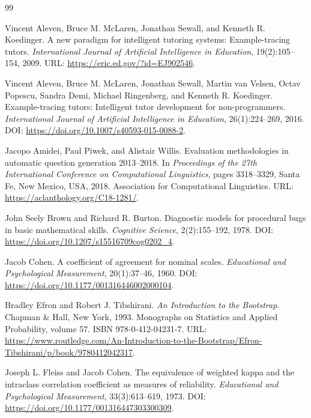 \begin{thebibliography}{99}

Vincent Aleven, Bruce M. McLaren, Jonathan Sewall, and Kenneth R. Koedinger.
\newblock A new paradigm for intelligent tutoring systems: Example-tracing tutors.
\newblock \emph{International Journal of Artificial Intelligence in Education}, 19(2):105--154, 2009.
\newblock URL: \url{https://eric.ed.gov/?id=EJ902546}.

Vincent Aleven, Bruce M. McLaren, Jonathan Sewall, Martin van Velsen, Octav Popescu, Sandra Demi, Michael Ringenberg, and Kenneth R. Koedinger.
\newblock Example-tracing tutors: Intelligent tutor development for non-programmers.
\newblock \emph{International Journal of Artificial Intelligence in Education}, 26(1):224--269, 2016.
\newblock DOI: \url{https://doi.org/10.1007/s40593-015-0088-2}.

Jacopo Amidei, Paul Piwek, and Alistair Willis.
\newblock Evaluation methodologies in automatic question generation 2013--2018.
\newblock In \emph{Proceedings of the 27th International Conference on Computational Linguistics}, pages 3318--3329, Santa Fe, New Mexico, USA, 2018. Association for Computational Linguistics.
\newblock URL: \url{https://aclanthology.org/C18-1281/}.

John Seely Brown and Richard R. Burton.
\newblock Diagnostic models for procedural bugs in basic mathematical skills.
\newblock \emph{Cognitive Science}, 2(2):155--192, 1978.
\newblock DOI: \url{https://doi.org/10.1207/s15516709cog0202_4}.

Jacob Cohen.
\newblock A coefficient of agreement for nominal scales.
\newblock \emph{Educational and Psychological Measurement}, 20(1):37--46, 1960.
\newblock DOI: \url{https://doi.org/10.1177/001316446002000104}.

Bradley Efron and Robert J. Tibshirani.
\newblock \emph{An Introduction to the Bootstrap}.
\newblock Chapman \& Hall, New York, 1993. Monographs on Statistics and Applied Probability, volume 57. ISBN 978-0-412-04231-7.
\newblock URL: \url{https://www.routledge.com/An-Introduction-to-the-Bootstrap/Efron-Tibshirani/p/book/9780412042317}.

Joseph L. Fleiss and Jacob Cohen.
\newblock The equivalence of weighted kappa and the intraclass correlation coefficient as measures of reliability.
\newblock \emph{Educational and Psychological Measurement}, 33(3):613--619, 1973.
\newblock DOI: \url{https://doi.org/10.1177/001316447303300309}.


\end{thebibliography}
